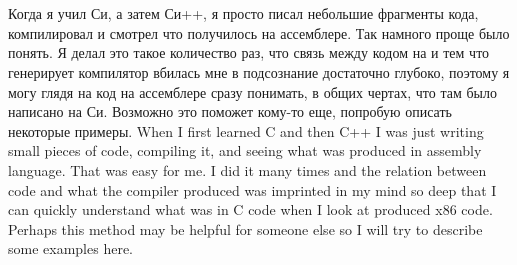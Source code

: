 ﻿\chapter{}

\IFRU
{Когда я учил Си, а затем Си++, я просто писал небольшие фрагменты кода, компилировал и смотрел что 
получилось на ассемблере. Так намного проще было понять. Я делал это такое количество раз, 
что связь между кодом на \CCpp и тем что генерирует компилятор вбилась мне в подсознание достаточно 
глубоко, поэтому я могу глядя на код на ассемблере сразу понимать, в общих чертах, что там было написано 
на Си. Возможно это поможет кому-то еще, попробую описать некоторые примеры.}
{When I first learned C and then C++ I was just writing small pieces of code, compiling it, 
and seeing what 
was produced in assembly language. That was easy for me. I did it many times and the relation 
between \CCpp code and what the compiler produced was imprinted in my mind so deep that 
I can quickly understand what was in C code when I look at produced x86 code. 
Perhaps this method may be helpful for someone else so I will try to describe some examples here.}




























